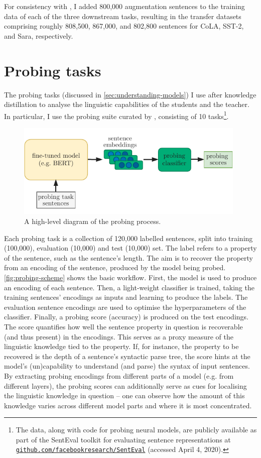 \documentclass[bsc,frontabs,twoside,singlespacing,parskip,deptreport]{infthesis}
\newcommand\rurl[1]{%
  \href{https://#1}{\nolinkurl{#1}}%
}
\begin{document}
{{    For consistency with \citet{Tang_2019b}, I added 800,000 augmentation sentences to the training data of each of the three downstream tasks, resulting in the transfer datasets comprising roughly 808,500, 867,000, and 802,800 sentences for CoLA, SST-2, and Sara, respectively.
  }

  \section{Probing tasks}{
    The probing tasks (discussed in \autoref{sec:understanding-models}) I use after knowledge distillation to analyse the linguistic capabilities of the students and the teacher. In particular, I use the probing suite curated by \citet{Conneau_2018}, consisting of 10 tasks\footnote{The data, along with code for probing neural models, are publicly available as part of the SentEval toolkit for evaluating sentence representations \citep{SentEval-paper} at \rurl{github.com/facebookresearch/SentEval} (accessed April 4, 2020).}.

    \begin{figure}[h!t]
      \centering
      \includegraphics[width=11cm]{graphics/probing-scheme}
      \caption{A high-level diagram of the probing process.}
      \label{fig:probing-scheme}
    \end{figure}

    Each probing task is a collection of 120,000 labelled sentences, split into training (100,000), evaluation (10,000) and test (10,000) set. The label refers to a property of the sentence, such as the sentence's length. The aim is to recover the property from an encoding of the sentence, produced by the model being probed. \autoref{fig:probing-scheme} shows the basic workflow. First, the model is used to produce an encoding of each sentence. Then, a light-weight classifier is trained, taking the training sentences' encodings as inputs and learning to produce the labels. The evaluation sentence encodings are used to optimise the hyperparameters of the classifier. Finally, a probing score (accuracy) is produced on the test encodings. The score quantifies how well the sentence property in question is recoverable (and thus present) in the encodings. This serves as a proxy measure of the linguistic knowledge tied to the property. If, for instance, the property to be recovered is the depth of a sentence's syntactic parse tree, the score hints at the model's (un)capability to understand (and parse) the syntax of input sentences.
    By extracting probing encodings from different parts of a model (e.g. from different layers), the probing scores can additionally serve as cues for localising the linguistic knowledge in question -- one can observe how the amount of this knowledge varies across different model parts and where it is most concentrated.

}}
\end{document}
